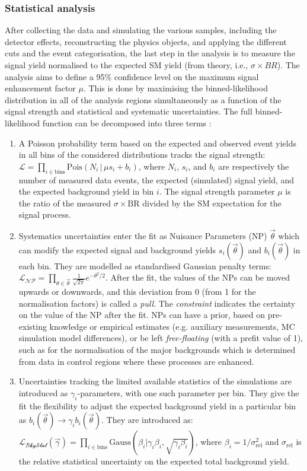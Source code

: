 \subsubsection{Statistical analysis}
After collecting the data and simulating the various samples, including the detector effects, reconstructing the physics objects, and applying the different cuts and the event categorisation, the last step in the analysis is to measure the signal yield normalised to the expected SM yield (from theory, i.e., $\sigma \times BR$). The analysis aims to define a 95\% confidence level on the maximum signal enhancement factor $\mu$. This is done by maximising the binned-likelihood distribution in all of the analysis regions simultaneously as a function of the signal strength and statistical and systematic uncertainties. The full binned-likelihood function can be decomposed into three terms \cite{Mironova:2837159}: 
\begin{enumerate}
\item A Poisson probability term based on the expected and observed event yields in all bins of the considered distributions tracks the signal strength: $\mathcal{L} = \prod_{i\in \textrm{bins}} \textrm{Pois}(N_i \,|\, \mu s_i + b_i)$, where $N_i$, $s_i$, and $b_i$ are respectively the number of measured data events, the expected (simulated) signal yield, and the expected background yield in bin $i$. The signal strength parameter $\mu$ is the ratio of the measured $\sigma \times \textrm{BR}$ divided by the SM expectation for the signal process.  
\item Systematics uncertainties enter the fit as Nuisance Parameters (NP) $\overrightarrow{\theta}$ which can modify the expected signal and background yields $s_i(\overrightarrow{\theta})$ and $b_i(\overrightarrow{\theta})$ in each bin. They are modelled as standardised Gaussian penalty terms: $\mathcal{L_{\textrm{NP}}} = \prod_{\theta \in \overrightarrow{\theta}} \frac{1}{\sqrt{2\pi}} e^{- \theta^2/2}$. After the fit, the values of the NPs can be moved upwards or downwards, and this deviation from 0 (from 1 for the normalisation factors) is called a \textit{pull}. The \textit{constraint} indicates the certainty on the value of the NP after the fit. NPs can have a prior, based on pre-existing knowledge or empirical estimates (e.g. auxiliary measurements, MC simulation model differences), or be left \textit{free-floating} (with a prefit value of 1), such as for the normalisation of the major backgrounds which is determined from data in control regions where these processes are enhanced. 
\item Uncertainties tracking the limited available statistics of the simulations are introduced as $\gamma_i$-parameters, with one such parameter per bin. They give the fit the flexibility to adjust the expected background yield in a particular bin as $b_i(\overrightarrow{\theta}) \rightarrow \gamma_i b_i(\overrightarrow{\theta})$. They are introduced as: $\mathcal{L_{\textrm{BkgStat}}}(\overrightarrow{\gamma}) = \prod_{i \in \textrm{bins}} \textrm{Gauss}(\beta_i | \gamma_i \beta_i, \sqrt{\gamma_i \beta_i})$, where $\beta_i = 1 / \sigma^2_\textrm{rel}$ and $\sigma_\textrm{rel}$ is the relative statistical uncertainty on the expected total background yield. 
\end{enumerate} 
